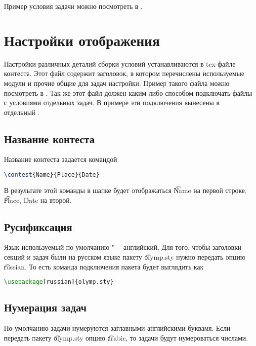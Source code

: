 \documentclass[11pt,a4paper,oneside]{article}
\begin{document}
Пример условия задачи можно посмотреть в .

\newpage
\section{Настройки отображения}

Настройки различных деталий сборки условий устанавливаются в tex-файле контеста.
Этот файл содержит заголовок, в котором перечислены используемые модули и прочие 
общие для задач настройки. Пример такого файла можно посмотреть в 
.
Так же этот файл должен каким-либо способом подключать файлы с условиями отдельных задач.
В примере эти подключения вынесены в отдельный .

\subsection{Название контеста}

Название контеста задается командой 
\begin{lstlisting}[language=tex]
\contest{Name}{Place}{Date}
\end{lstlisting}

В результате этой команды в шапке будет отображаться \t{Name} на первой строке,
\t{Place, Date} на второй.

\subsection{Русификсация}

Язык используемый по умолчанию "--- английский. Для того, чтобы заголовки секций и задач были на
русском языке пакету \t{olymp.sty} нужно передать опцию \t{russian}. То есть 
команда подключения пакета будет выглядить как
\begin{lstlisting}[language=tex]
\usepackage[russian]{olymp.sty}
\end{lstlisting}

\subsection{Нумерация задач}

По умолчанию задачи нумеруются заглавными английскими буквамя. Если передать пакету 
\t{olymp.sty} опцию \t{arabic}, то задачи будут нумероваться числами.
\end{document}

